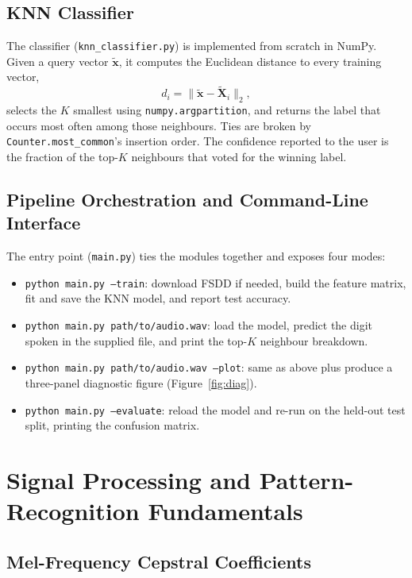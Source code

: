 \documentclass[12pt,a4paper]{article}
\begin{document}
\subsection{KNN Classifier}

The classifier (\texttt{knn\_classifier.py}) is implemented from scratch in
NumPy. Given a query vector $\tilde{\mathbf{x}}$, it computes the Euclidean
distance to every training vector,
\begin{equation}
    d_i = \|\tilde{\mathbf{x}} - \tilde{\mathbf{X}}_i\|_2,
\end{equation}
selects the $K$ smallest using \texttt{numpy.argpartition}, and returns the
label that occurs most often among those neighbours. Ties are broken by
\texttt{Counter.most\_common}'s insertion order. The confidence reported to
the user is the fraction of the top-$K$ neighbours that voted for the
winning label.

\subsection{Pipeline Orchestration and Command-Line Interface}

The entry point (\texttt{main.py}) ties the modules together and exposes
four modes:
\begin{itemize}
    \item \texttt{python main.py --train}: download FSDD if needed, build the
          feature matrix, fit and save the KNN model, and report test
          accuracy.
    \item \texttt{python main.py path/to/audio.wav}: load the model, predict
          the digit spoken in the supplied file, and print the top-$K$
          neighbour breakdown.
    \item \texttt{python main.py path/to/audio.wav --plot}: same as above
          plus produce a three-panel diagnostic figure (Figure~\ref{fig:diag}).
    \item \texttt{python main.py --evaluate}: reload the model and re-run on
          the held-out test split, printing the confusion matrix.
\end{itemize}

\section{Signal Processing and Pattern-Recognition Fundamentals}

\subsection{Mel-Frequency Cepstral Coefficients}
\end{document}
